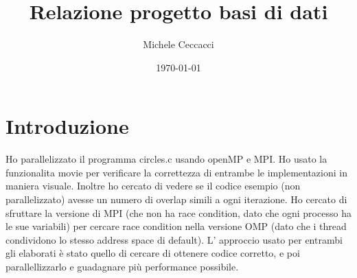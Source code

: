 \documentclass[a4paper,12pt, twoside]{report}
\begin{document}
\title{Relazione progetto basi di dati}
\author{Michele Ceccacci}
\date{\today}

\section*{Introduzione}
Ho parallelizzato il programma circles.c usando openMP e MPI. Ho usato la funzionalita movie per verificare la correttezza di entrambe le implementazioni in maniera visuale. Inoltre ho cercato di vedere se il codice esempio (non parallelizzato) avesse un numero di overlap simili a ogni iterazione. Ho cercato di sfruttare la versione di MPI (che non ha race condition, dato che ogni processo ha le sue variabili) per cercare race condition nella versione OMP (dato che i thread condividono lo stesso address space di default). 
L' approccio usato per entrambi gli elaborati è stato quello di cercare di ottenere codice corretto, e poi parallellizzarlo e guadagnare più performance possibile.
\end{document}
